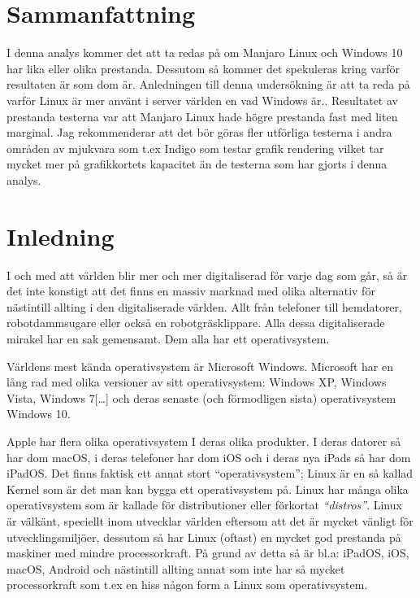 \documentclass[12pt, a4paper]{report}
\begin{document}
\section{Sammanfattning}\label{sum}

I denna analys kommer det att ta redas på om Manjaro Linux och Windows 10 har lika eller olika prestanda. Dessutom så kommer det spekuleras kring varför resultaten är som dom är. Anledningen till denna undersökning är att ta reda på varför Linux är mer använt i server världen en vad Windows är.\cite{linux-market}. Resultatet av prestanda testerna var att Manjaro Linux hade högre prestanda fast med liten marginal. Jag rekommenderar att det bör göras fler utförliga testerna i andra områden av mjukvara som t.ex Indigo\cite{indigo} som testar grafik rendering vilket tar mycket mer på grafikkortets kapacitet än de testerna som har gjorts i denna analys.


\vspace{1cm}

    
\section{Inledning}
 
 
   I och med att världen blir mer och mer digitaliserad för varje dag som går, så är det inte konstigt att det finns en massiv marknad med olika alternativ för nästintill allting i den digitaliserade världen. Allt från telefoner till hemdatorer, robotdammsugare eller också en robotgräsklippare. Alla dessa digitaliserade mirakel har en sak gemensamt. Dem alla har ett operativsystem.
 
   Världens mest kända operativsystem\cite{winstat} är Microsoft Windows. Microsoft har en lång rad med olika versioner av sitt operativsystem\cite{windows}: Windows XP, Windows Vista, Windows 7[\dots] och deras senaste (och förmodligen sista) operativsystem Windows 10.
    
   Apple har flera olika operativsystem I deras olika produkter. I deras datorer så har dom macOS, i deras telefoner har dom iOS och i deras nya iPads så har dom iPadOS.\cite{appleOS}
    Det finns faktisk ett annat stort ``operativsystem''; Linux är en så kallad Kernel \cite{redhat} som är det man kan bygga ett operativsystem på. Linux har många olika operativsystem som är kallade för distributioner eller förkortat \textit{``distros''}. Linux är välkänt, speciellt inom utvecklar världen eftersom att det är mycket vänligt för utvecklingsmiljöer, dessutom så har Linux (oftast) en mycket god prestanda på maskiner med mindre processorkraft\cite{whatislinux}. På grund av detta så är bl.a: iPadOS, iOS, macOS, Android och nästintill allting annat som inte har så mycket processorkraft som t.ex en hiss någon form a Linux som operativsystem.
\end{document}
